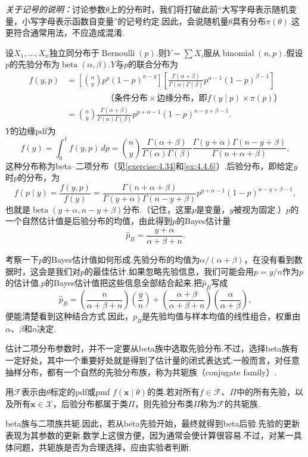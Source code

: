 \emph{关于记号的说明：}讨论参数$\theta$上的分布时，我们将打破此前“大写字母表示随机变量，小写字母表示函数自变量”的记号约定.因此，会说随机量$\theta$具有分布$\pi(\theta)$.这更符合通常用法，不应造成混淆.
\begin{example}[二项分布的Bayes估计]\label{ex:7.2.14}
设$X_1,\ldots,X_n$独立同分布于$\operatorname{Bernoulli}(p)$.则$Y=\sum X_i$服从$\operatorname{binomial}(n,p)$.假设$p$的先验分布为$\operatorname{beta}(\alpha,\beta)$.$Y$与$p$的联合分布为
\begin{align*}
f(y,p)&=\left[\binom ny p^y(1-p)^{n-y}\right]\left[\frac{\Gamma(\alpha+\beta)}{\Gamma(\alpha)\Gamma(\beta)}p^{\alpha-1}(1-p)^{\beta-1}\right]\\
&\hspace{2cm}\text{（条件分布$\times$边缘分布，即$f(y\mid p)\times\pi(p)$）}\\
&=\binom ny\frac{\Gamma(\alpha+\beta)}{\Gamma(\alpha)\Gamma(\beta)}p^{y+\alpha-1}(1-p)^{n-y+\beta-1}.
\end{align*}
$Y$的边缘pdf为
\begin{equation}\label{eq:7.2.9}
f(y)=\int_0^1f(y,p)\,dp=\binom ny\frac{\Gamma(\alpha+\beta)}{\Gamma(\alpha)\Gamma(\beta)}\frac{\Gamma(y+\alpha)\Gamma(n-y+\beta)}{\Gamma(n+\alpha+\beta)},
\end{equation}
这种分布称为beta--二项分布（见\autoref{exercise:4.34}和\autoref{ex:4.4.6}）.后验分布，即给定$y$时$p$的分布，为
$$f(p\mid y)=\frac{f(y,p)}{f(y)}=\frac{\Gamma(n+\alpha+\beta)}{\Gamma(y+\alpha)\Gamma(n-y+\beta)}p^{y+\alpha-1}(1-p)^{n-y+\beta-1},$$
也就是$\operatorname{beta}(y+\alpha,n-y+\beta)$分布.（记住，这里$p$是变量，$y$被视为固定.）$p$的一个自然估计值是后验分布的均值，由此得到$p$的Bayes估计量
$$\widehat p_B=\frac{y+\alpha}{\alpha+\beta+n}.$$
\end{example}
考察一下$p$的Bayes估计值如何形成.先验分布的均值为$\alpha/(\alpha+\beta)$，在没有看到数据时，这会是我们对$p$的最佳估计.如果忽略先验信息，我们可能会用$p=y/n$作为$p$的估计值.$p$的Bayes估计值把这些信息全部结合起来.把$\widehat p_B$写成
$$\widehat p_B=\left(\frac n{\alpha+\beta+n}\right)\left(\frac yn\right)+\left(\frac{\alpha+\beta}{\alpha+\beta+n}\right)\left(\frac\alpha{\alpha+\beta}\right),$$
便能清楚看到这种结合方式.因此，$p_B$是先验均值与样本均值的线性组合，权重由$\alpha$、$\beta$和$n$决定.

估计二项分布参数时，并不一定要从beta族中选取先验分布.不过，选择beta族有一定好处，其中一个重要好处就是得到了估计量的闭式表达式.一般而言，对任意抽样分布，都有一个自然的先验分布族，称为共轭族（conjugate family）.
\begin{definition}\label{def:7.2.15}
用$\mathcal F$表示由$\theta$标定的pdf或pmf $f(\boldsymbol x\mid\theta)$的类.若对所有$f\in\mathcal F$、$\Pi$中的所有先验，以及所有$\boldsymbol x\in\mathcal X$，后验分布都属于类$\Pi$，则先验分布类$\Pi$称为$\mathcal F$的共轭族.
\end{definition}
beta族与二项族共轭.因此，若从beta先验开始，最终就得到beta后验.先验的更新表现为其参数的更新.数学上这很方便，因为通常会使计算很容易.不过，对某一具体问题，共轭族是否为合理选择，应由实验者判断.

